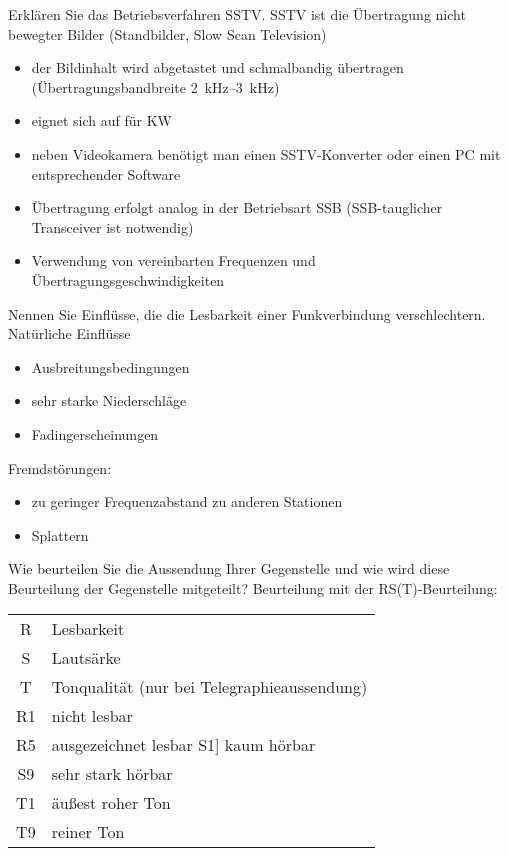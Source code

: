 \documentclass[avery5371,grid,frame,a4paper]{flashcards}
\newcommand{\card}[3]{
  \begin{flashcard}[{\chap} -- #1]{#2}#3\end{flashcard}
}
\begin{document}
\card{67}{Erklären Sie das Betriebsverfahren SSTV.}{
  \footnotesize
  SSTV ist die Übertragung nicht bewegter Bilder (Standbilder, Slow Scan Television)
  \begin{itemize}
    \item der Bildinhalt wird abgetastet und schmalbandig übertragen (Übertragungsbandbreite \SIrange{2}{3}{\kilo\Hz})
    \item eignet sich auf für KW
    \item neben Videokamera benötigt man einen SSTV-Konverter oder einen PC mit entsprechender Software
    \item Übertragung erfolgt analog in der Betriebsart SSB (SSB-tauglicher Transceiver ist notwendig)
    \item Verwendung von vereinbarten Frequenzen und Übertragungsgeschwindigkeiten
  \end{itemize}
}
\card{68}{Nennen Sie Einflüsse, die die Lesbarkeit einer Funkverbindung verschlechtern.}{
  \small
  Natürliche Einflüsse
  \begin{itemize}
    \item  Ausbreitungsbedingungen
    \item sehr starke Niederschläge
    \item Fadingerscheinungen
  \end{itemize}

  Fremdstörungen:
  \begin{itemize}
    \item zu geringer Frequenzabstand zu anderen Stationen
    \item Splattern
  \end{itemize}
}
\card{69}{Wie beurteilen Sie die Aussendung Ihrer Gegenstelle und wie wird diese Beurteilung der Gegenstelle mitgeteilt?}{
  Beurteilung mit der RS(T)-Beurteilung:

  \begin{tabular}{cl}
    R & Lesbarkeit \\
    S & Lautsärke \\
    T & Tonqualität (nur bei Telegraphieaussendung) \\

    R1 & nicht lesbar \\
    R5 & ausgezeichnet lesbar S1] kaum hörbar \\
    S9 & sehr stark hörbar \\
    T1 & äußest roher Ton \\
    T9 & reiner Ton \\
  \end{tabular}
}
\end{document}
